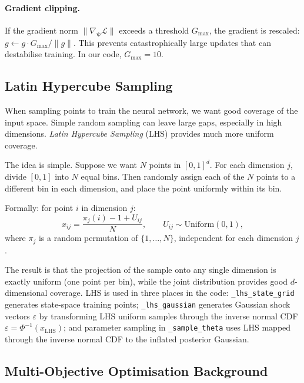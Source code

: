 \documentclass[11pt,a4paper]{article}
\theoremstyle{definition}
\newcommand{\bpsi}{\boldsymbol{\psi}}
\newcommand{\code}[1]{\texttt{\color{codecolor}#1}}
\begin{document}
	\paragraph{Gradient clipping.}
	If the gradient norm $\|\nabla_{\bpsi}\mathcal{L}\|$ exceeds a threshold $G_{\max}$, the gradient is rescaled: $g \leftarrow g \cdot G_{\max}/\|g\|$.
	This prevents catastrophically large updates that can destabilise training.
	In our code, $G_{\max} = 10$.
	
	\subsection{Latin Hypercube Sampling}
	\label{sec:lhs}
	
	When sampling points to train the neural network, we want good coverage of the input space.
	Simple random sampling can leave large gaps, especially in high dimensions.
	\emph{Latin Hypercube Sampling} (LHS) provides much more uniform coverage.
	
	The idea is simple.
	Suppose we want $N$ points in $[0,1]^d$.
	For each dimension $j$, divide $[0,1]$ into $N$ equal bins.
	Then randomly assign each of the $N$ points to a different bin in each dimension, and place the point uniformly within its bin.
	
	Formally: for point $i$ in dimension $j$:
	\begin{equation}
		x_{ij} = \frac{\pi_j(i) - 1 + U_{ij}}{N}, \qquad U_{ij} \sim \text{Uniform}(0,1),
	\end{equation}
	where $\pi_j$ is a random permutation of $\{1, \ldots, N\}$, independent for each dimension $j$.
	
	The result is that the projection of the sample onto any single dimension is exactly uniform (one point per bin), while the joint distribution provides good $d$-dimensional coverage.
	LHS is used in three places in the code: \code{\_lhs\_state\_grid} generates state-space training points; \code{\_lhs\_gaussian} generates Gaussian shock vectors $\varepsilon$ by transforming LHS uniform samples through the inverse normal CDF $\varepsilon = \Phi^{-1}(x_{\text{LHS}})$; and parameter sampling in \code{\_sample\_theta} uses LHS mapped through the inverse normal CDF to the inflated posterior Gaussian.
	
	\subsection{Multi-Objective Optimisation Background}
	\label{sec:multiobj_bg}
	
\end{document}
